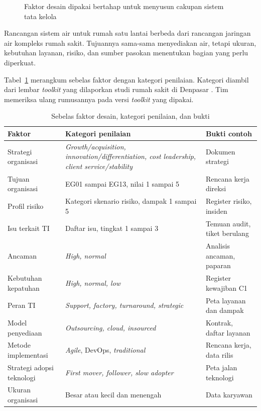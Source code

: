 \begin{figure}[!htb]
  \centering
  
  \caption{Faktor desain dipakai bertahap untuk menyusun cakupan sistem tata kelola}
  \label{fig:ch04-cakupan-desain}
\end{figure}

Rancangan sistem air untuk rumah satu lantai berbeda dari rancangan jaringan air kompleks rumah sakit.
Tujuannya sama-sama menyediakan air, tetapi ukuran, kebutuhan layanan, risiko, dan sumber pasokan menentukan
bagian yang perlu diperkuat.

Tabel~\ref{tab:ch04-faktor} merangkum sebelas faktor dengan kategori penilaian. Kategori diambil dari
lembar \textit{toolkit} yang dilaporkan studi rumah sakit di Denpasar \cite{c04-denpasar}. Tim memeriksa
ulang rumusannya pada versi \textit{toolkit} yang dipakai.

\begin{table}[!htb]
  \centering\footnotesize
  \caption{Sebelas faktor desain, kategori penilaian, dan bukti}\label{tab:ch04-faktor}
  \begin{tabularx}{\textwidth}{|>{\raggedright\arraybackslash}p{}|>{\raggedright\arraybackslash}X|>{\raggedright\arraybackslash}p{}|}
    \hline
    \textbf{Faktor} & \textbf{Kategori penilaian} & \textbf{Bukti contoh} \\ \hline
    Strategi organisasi & \textit{Growth/acquisition, innovation/differentiation, cost leadership, client
    service/stability} & Dokumen strategi \\ \hline
    Tujuan organisasi & EG01 sampai EG13, nilai 1 sampai 5 & Rencana kerja direksi \\ \hline
    Profil risiko & Kategori skenario risiko, dampak 1 sampai 5 & Register risiko, insiden \\ \hline
    Isu terkait TI & Daftar isu, tingkat 1 sampai 3 & Temuan audit, tiket berulang \\ \hline
    Ancaman & \textit{High, normal} & Analisis ancaman, paparan \\ \hline
    Kebutuhan kepatuhan & \textit{High, normal, low} & Register kewajiban C1 \\ \hline
    Peran TI & \textit{Support, factory, turnaround, strategic} & Peta layanan dan dampak \\ \hline
    Model penyediaan & \textit{Outsourcing, cloud, insourced} & Kontrak, daftar layanan \\ \hline
    Metode implementasi & \textit{Agile}, DevOps, \textit{traditional} & Rencana kerja, data rilis \\ \hline
    Strategi adopsi teknologi & \textit{First mover, follower, slow adopter} & Peta jalan teknologi \\ \hline
    Ukuran organisasi & Besar atau kecil dan menengah & Data karyawan \\ \hline
  \end{tabularx}
\end{table}

